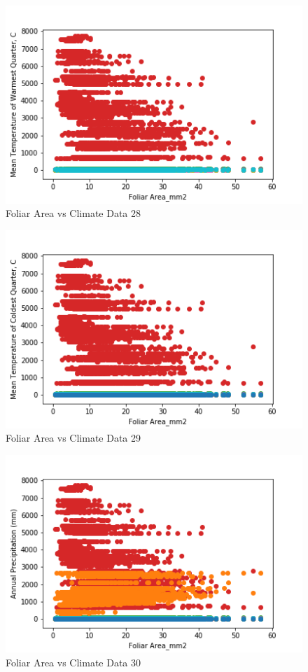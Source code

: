 \documentclass[letterpaper]{article}
\begin{document}
\begin{figure}[h]
\caption{Foliar Area vs Climate Data 28\label{fig:Foliar_Area_vs_28}}
\centering
\includegraphics[width=0.7\paperwidth]{Foliar_Area_vs_28}
\end{figure}


\begin{figure}[h]
\caption{Foliar Area vs Climate Data 29\label{fig:Foliar_Area_vs_29}}
\centering
\includegraphics[width=0.7\paperwidth]{Foliar_Area_vs_29}
\end{figure}


\begin{figure}[h]
\caption{Foliar Area vs Climate Data 30\label{fig:Foliar_Area_vs_30}}
\centering
\includegraphics[width=0.7\paperwidth]{Foliar_Area_vs_30}
\end{figure}
\end{document}
